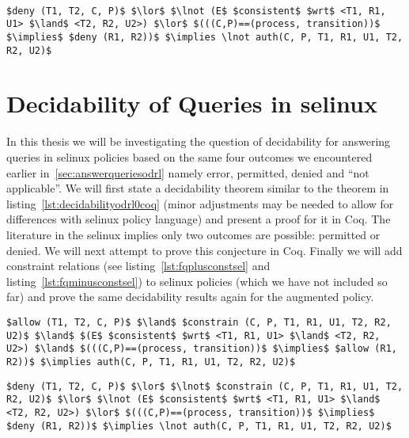 \lstset{mathescape, language=AST} 
\begin{lstlisting}[frame=single, caption={$f^{-}_q$ for \ac{selinux}},label={lst:fqminussel}]

$deny (T1, T2, C, P)$ $\lor$ $\lnot (E$ $consistent$ $wrt$ <T1, R1, U1> $\land$ <T2, R2, U2>) $\lor$ $(((C,P)==(process, transition))$ $\implies$ $deny (R1, R2))$ $\implies \lnot auth(C, P, T1, R1, U1, T2, R2, U2)$ 

\end{lstlisting}

\section{Decidability of Queries in \ac{selinux}}

In this thesis we will be investigating the question of decidability for answering queries in \ac{selinux} policies based on the same four outcomes we encountered earlier in~\ref{sec:answerqueriesodrl} namely error, permitted, denied and ``not applicable''. We will first state a decidability theorem similar to the theorem in listing~\ref{lst:decidabilityodrl0coq} (minor adjustments may be needed to allow for differences with \ac{selinux} policy language) and present a proof for it in Coq. The literature in the \ac{selinux} implies only two outcomes are possible: permitted or denied. We will next attempt to prove this conjecture in Coq. Finally we will add constraint relations (see listing~\ref{lst:fqplusconstsel} and listing~\ref{lst:fqminusconstsel}) to \ac{selinux} policies (which we have not included so far) and prove the same decidability results again for the augmented policy.

\lstset{mathescape, language=AST} 
\begin{lstlisting}[frame=single, caption={$f^{+}_q$ for \ac{selinux}},label={lst:fqplusconstsel}]
$allow (T1, T2, C, P)$ $\land$ $constrain (C, P, T1, R1, U1, T2, R2, U2)$ $\land$ $(E$ $consistent$ $wrt$ <T1, R1, U1> $\land$ <T2, R2, U2>) $\land$ $(((C,P)==(process, transition))$ $\implies$ $allow (R1, R2))$ $\implies auth(C, P, T1, R1, U1, T2, R2, U2)$ 

\end{lstlisting}

\lstset{mathescape, language=AST} 
\begin{lstlisting}[frame=single, caption={$f^{-}_q$ for \ac{selinux}},label={lst:fqminusconstsel}]
$deny (T1, T2, C, P)$ $\lor$ $\lnot$ $constrain (C, P, T1, R1, U1, T2, R2, U2)$ $\lor$ $\lnot (E$ $consistent$ $wrt$ <T1, R1, U1> $\land$ <T2, R2, U2>) $\lor$ $(((C,P)==(process, transition))$ $\implies$ $deny (R1, R2))$ $\implies \lnot auth(C, P, T1, R1, U1, T2, R2, U2)$ 

\end{lstlisting}
